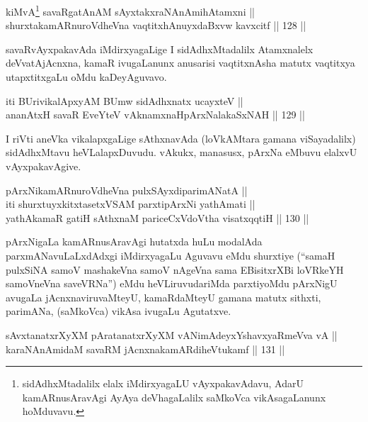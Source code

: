

\begin{shl}
kiMvA\footnote{sidAdhxMtadalilx elalx iMdirxyagaLU vAyxpakavAdavu, AdarU
kamARnusAravAgi AyAya deVhagaLalilx saMkoVca vikAsagaLanunx hoMduvavu.} savaRgatAnAM sAyxtakxraNAnAmihA\s \s tamxni || \\
shurxtakamARnuroVdheVna vaqtitxhAnuyxdaBxvw kavxcitf \hfill || 128 ||  
\end{shl}

\begin{artha}
savaRvAyxpakavAda iMdirxyagaLige I sidAdhxMtadalilx
Atamxnalelx deVvatAjAcnxna, kamaR ivugaLanunx anusarisi vaqtitxnAsha
matutx vaqtitxya utapxtitxgaLu oMdu kaDeyAguvavo.
\end{artha}


\begin{shl}
iti BUrivikalApxyAM BUmw sidAdhxnatx ucayxteV || \\
ananAtxH savaR EveYteV vAknamxnaHpArxNalakaSxNAH \hfill || 129 ||  
\end{shl}

\begin{artha}
I riVti aneVka vikalapxgaLige sAthxnavAda (loVkAMtara gamana
viSayadalilx) sidAdhxMtavu heVLalapxDuvudu. vAkukx, manasusx, pArxNa
eMbuvu elalxvU vAyxpakavAgive.
\end{artha}

\begin{shl}
pArxNikamARnuroVdheVna pulxSAyxdiparimANatA || \\
iti shurxtuyxkitxtasetxVSAM parxtipArxNi yathAmati || \\
yathAkamaR gatiH sAthxnaM pariceCxVdoV\s tha visatxqqtiH \hfill || 130 ||  
\end{shl}

\begin{artha}
pArxNigaLa kamARnusAravAgi hutatxda huLu modalAda parxmANavuLaLxdAdxgi
iMdirxyagaLu Aguvavu eMdu shurxtiye (``samaH pulxSiNA samoV mashakeVna samoV nAgeVna sama EBisitxrXBi loVRkeYH samoV\s neVna saveVRNa'') eMdu heVLiruvudariMda parxtiyoMdu pArxNigU avugaLa jAcnxnaviruvaMteyU, kamaRdaMteyU gamana
matutx sithxti, parimANa, (saMkoVca) vikAsa ivugaLu Agutatxve.
\end{artha}

\begin{shl}
sAvxtanatxrXyXM pAratanatxrXyXM vA\s NimAdeyxYshavxyaRmeVva vA || \\
karaNAnAmidaM savaRM jAcnxnakamARdiheVtukamf \hfill || 131 ||  
\end{shl}

